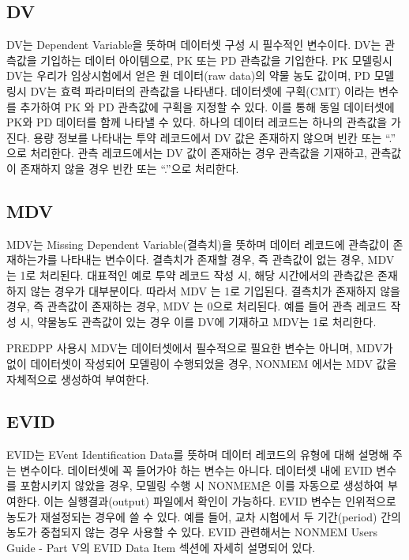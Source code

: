 \documentclass[
  10pt,
]{krantz}
\begin{document}
\hypertarget{dv}{%
\subsection{DV}\label{dv}}

DV는 Dependent Variable을 뜻하며 데이터셋 구성 시 필수적인 변수이다. DV는 관측값을 기입하는 데이터 아이템으로, PK 또는 PD 관측값을 기입한다. PK 모델링시 DV는 우리가 임상시험에서 얻은 원 데이터(raw data)의 약물 농도 값이며, PD 모델링시 DV는 효력 파라미터의 관측값을 나타낸다. 데이터셋에 구획(CMT) 이라는 변수를 추가하여 PK 와 PD 관측값에 구획을 지정할 수 있다. 이를 통해 동일 데이터셋에 PK와 PD 데이터를 함께 나타낼 수 있다. 하나의 데이터 레코드는 하나의 관측값을 가진다. 용량 정보를 나타내는 투약 레코드에서 DV 값은 존재하지 않으며 빈칸 또는 ``.'' 으로 처리한다. 관측 레코드에서는 DV 값이 존재하는 경우 관측값을 기재하고, 관측값이 존재하지 않을 경우 빈칸 또는 ``.''으로 처리한다.

\hypertarget{mdv}{%
\subsection{MDV}\label{mdv}}

MDV는 Missing Dependent Variable(결측치)을 뜻하며 데이터 레코드에 관측값이 존재하는가를 나타내는 변수이다. 결측치가 존재할 경우, 즉 관측값이 없는 경우, MDV 는 1로 처리된다. 대표적인 예로 투약 레코드 작성 시, 해당 시간에서의 관측값은 존재하지 않는 경우가 대부분이다. 따라서 MDV 는 1로 기입된다. 결측치가 존재하지 않을 경우, 즉 관측값이 존재하는 경우, MDV 는 0으로 처리된다. 예를 들어 관측 레코드 작성 시, 약물농도 관측값이 있는 경우 이를 DV에 기재하고 MDV는 1로 처리한다.

PREDPP 사용시 MDV는 데이터셋에서 필수적으로 필요한 변수는 아니며, MDV가 없이 데이터셋이 작성되어 모델링이 수행되었을 경우, NONMEM 에서는 MDV 값을 자체적으로 생성하여 부여한다.

\hypertarget{evid}{%
\subsection{EVID}\label{evid}}

EVID는 EVent Identification Data를 뜻하며 데이터 레코드의 유형에 대해 설명해 주는 변수이다. 데이터셋에 꼭 들어가야 하는 변수는 아니다. 데이터셋 내에 EVID 변수를 포함시키지 않았을 경우, 모델링 수행 시 NONMEM은 이를 자동으로 생성하여 부여한다. 이는 실행결과(output) 파일에서 확인이 가능하다. EVID 변수는 인위적으로 농도가 재설정되는 경우에 쓸 수 있다. 예를 들어, 교차 시험에서 두 기간(period) 간의 농도가 중첩되지 않는 경우 사용할 수 있다. EVID 관련해서는 NONMEM Users Guide - Part V의 EVID Data Item 섹션에 자세히 설명되어 있다.
\end{document}
